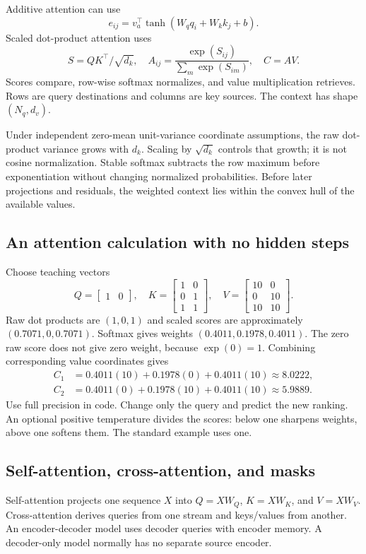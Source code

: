 Additive attention can use
\[e_{ij}=v_a^\top\tanh(W_qq_i+W_kk_j+b).\]
Scaled dot-product attention uses
\[S=QK^\top/\sqrt{d_k},\quad
A_{ij}=\frac{\exp(S_{ij})}{\sum_m\exp(S_{im})},\quad C=AV.\]
Scores compare, row-wise softmax normalizes, and value multiplication
retrieves. Rows are query destinations and columns are key sources.
The context has shape $(N_q,d_v)$.

Under independent zero-mean unit-variance coordinate assumptions, the raw
dot-product variance grows with $d_k$. Scaling by $\sqrt{d_k}$ controls
that growth; it is not cosine normalization. Stable softmax subtracts the
row maximum before exponentiation without changing normalized probabilities.
Before later projections and residuals, the weighted context lies within
the convex hull of the available values.

\subsection{An attention calculation with no hidden steps}
Choose teaching vectors
\[Q=\begin{bmatrix}1&0\end{bmatrix},\quad
K=\begin{bmatrix}1&0\\0&1\\1&1\end{bmatrix},\quad
V=\begin{bmatrix}10&0\\0&10\\10&10\end{bmatrix}.\]
Raw dot products are $(1,0,1)$ and scaled scores are approximately
$(0.7071,0,0.7071)$. Softmax gives weights
$(0.4011,0.1978,0.4011)$. The zero raw score does not give zero weight,
because $\exp(0)=1$. Combining corresponding value coordinates gives
\begin{align*}
C_1&=0.4011(10)+0.1978(0)+0.4011(10)\approx8.0222,\\
C_2&=0.4011(0)+0.1978(10)+0.4011(10)\approx5.9889.
\end{align*}
Use full precision in code. Change only the query and predict the new
ranking. An optional positive temperature divides the scores: below one
sharpens weights, above one softens them. The standard example uses one.

\subsection{Self-attention, cross-attention, and masks}
Self-attention projects one sequence $X$ into $Q=XW_Q$, $K=XW_K$, and
$V=XW_V$. Cross-attention derives queries from one stream and keys/values
from another. An encoder-decoder model uses decoder queries with encoder
memory. A decoder-only model normally has no separate source encoder.

